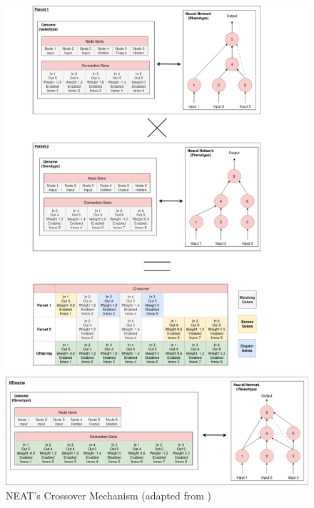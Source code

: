 \begin{figure}[H] %
	\centering %
	\includegraphics[width=\textwidth]{Figures/chapter_ne/ne_neat_crossover.png} %
	\caption{NEAT's Crossover Mechanism (adapted from \cite{stanley2002evolving})}
	\label{fig:neat_crossover} %
\end{figure}

